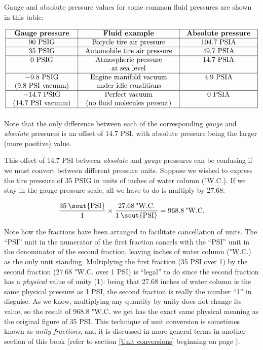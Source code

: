 \filbreak

Gauge and absolute pressure values for some common fluid pressures are shown in this table:


$$\vbox{\offinterlineskip
\halign{\strut
\vrule \quad\hfil # \ \hfil & 
\vrule \quad\hfil # \ \hfil & 
\vrule \quad\hfil # \ \hfil \vrule \cr
\noalign{\hrule}
%
\textbf{Gauge pressure} & \textbf{Fluid example} & \textbf{Absolute pressure} \cr
%
\noalign{\hrule}
%
90 PSIG & Bicycle tire air pressure & 104.7 PSIA \cr
%
\noalign{\hrule}
%
35 PSIG & Automobile tire air pressure & 49.7 PSIA \cr
%
\noalign{\hrule}
%
0 PSIG & Atmospheric pressure & 14.7 PSIA \cr
 & at sea level & \cr
%
\noalign{\hrule}
%
$-9.8$ PSIG & Engine manifold vacuum & 4.9 PSIA \cr
(9.8 PSI vacuum) & under idle conditions & \cr
%
\noalign{\hrule}
%
$-14.7$ PSIG & Perfect vacuum & 0 PSIA \cr
(14.7 PSI vacuum) & (no fluid molecules present) & \cr
%
\noalign{\hrule}
%
} %
}$$ %

Note that the only difference between each of the corresponding \textit{gauge} and \textit{absolute} pressures is an offset of 14.7 PSI, with absolute pressure being the larger (more positive) value.

This offset of 14.7 PSI between \textit{absolute} and \textit{gauge} pressures can be confusing if we must convert between different pressure units.  Suppose we wished to express the tire pressure of 35 PSIG in units of inches of water column ("W.C.).  If we stay in the gauge-pressure scale, all we have to do is multiply by 27.68:

$${{35 \> \hbox{\sout{PSI}}} \over 1} \times {{27.68 \> \hbox{"W.C.}} \over {1 \> \hbox{\sout{PSI}}}} = 968.8 \> \hbox{"W.C.}$$

Note how the fractions have been arranged to facilitate cancellation of units.  The ``PSI'' unit in the numerator of the first fraction cancels with the ``PSI'' unit in the denominator of the second fraction, leaving inches of water column ("W.C.) as the only unit standing.  Multiplying the first fraction (35 PSI over 1) by the second fraction (27.68 "W.C. over 1 PSI) is ``legal'' to do since the second fraction has a \textit{physical} value of unity (1): being that 27.68 inches of water column is the same physical pressure as 1 PSI, the second fraction is really the number ``1'' in disguise.  As we know, multiplying any quantity by unity does not change its value, so the result of 968.8 "W.C. we get has the exact same physical meaning as the original figure of 35 PSI.  This technique of unit conversion is sometimes known as \textit{unity fractions}, and it is discussed in more general terms in another section of this book (refer to section \ref{Unit conversions} beginning on page \pageref{Unit conversions}).

